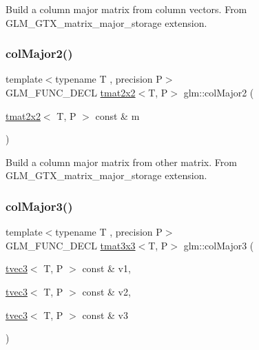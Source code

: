 Build a column major matrix from column vectors. From G\+L\+M\+\_\+\+G\+T\+X\+\_\+matrix\+\_\+major\+\_\+storage extension. \mbox{\label{group__gtx__matrix__major__storage_ga5cfd25de9d5b4c6a825085f38ddfeff7}} 
\subsubsection{\texorpdfstring{col\+Major2()}{colMajor2()}\hspace{0.1cm}{\footnotesize\ttfamily [2/2]}}
{\footnotesize\ttfamily template$<$typename T , precision P$>$ \\
G\+L\+M\+\_\+\+F\+U\+N\+C\+\_\+\+D\+E\+CL \hyperlink{structglm_1_1tmat2x2}{tmat2x2}$<$T, P$>$ glm\+::col\+Major2 (\begin{DoxyParamCaption}\item[{\hyperlink{structglm_1_1tmat2x2}{tmat2x2}$<$ T, P $>$ const \&}]{m }\end{DoxyParamCaption})}

Build a column major matrix from other matrix. From G\+L\+M\+\_\+\+G\+T\+X\+\_\+matrix\+\_\+major\+\_\+storage extension. \mbox{\label{group__gtx__matrix__major__storage_ga3a55e2948193e91733e434e7cc3c1540}} 
\subsubsection{\texorpdfstring{col\+Major3()}{colMajor3()}\hspace{0.1cm}{\footnotesize\ttfamily [1/2]}}
{\footnotesize\ttfamily template$<$typename T , precision P$>$ \\
G\+L\+M\+\_\+\+F\+U\+N\+C\+\_\+\+D\+E\+CL \hyperlink{structglm_1_1tmat3x3}{tmat3x3}$<$T, P$>$ glm\+::col\+Major3 (\begin{DoxyParamCaption}\item[{\hyperlink{structglm_1_1tvec3}{tvec3}$<$ T, P $>$ const \&}]{v1,  }\item[{\hyperlink{structglm_1_1tvec3}{tvec3}$<$ T, P $>$ const \&}]{v2,  }\item[{\hyperlink{structglm_1_1tvec3}{tvec3}$<$ T, P $>$ const \&}]{v3 }\end{DoxyParamCaption})}

